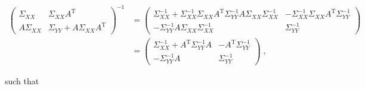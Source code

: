 \documentclass[a4paper,12pt]{article}
\begin{document}
\begin{equation} \label{eq:Sigma-yy-inv}
\begin{split}
\begin{pmatrix}
\Sigma_{XX}   & \Sigma_{XX} A^\mathrm{T} \\
A \Sigma_{XX} & \Sigma_{YY} + A \Sigma_{XX} A^\mathrm{T}
\end{pmatrix}^{-1}
&=\begin{pmatrix}
  \Sigma_{XX}^{-1} + \Sigma_{XX}^{-1} \Sigma_{XX} A^\mathrm{T} \Sigma_{YY}^{-1} A \Sigma_{XX} \Sigma_{XX}^{-1}
& -\Sigma_{XX}^{-1} \Sigma_{XX} A^\mathrm{T} \Sigma_{YY}^{-1} \\
  -\Sigma_{YY}^{-1} A \Sigma_{XX} \Sigma_{XX}^{-1}
& \Sigma_{YY}^{-1}
  \end{pmatrix} \\
&=\begin{pmatrix}
  \Sigma_{XX}^{-1} + A^\mathrm{T} \Sigma_{YY}^{-1} A
& -A^\mathrm{T} \Sigma_{YY}^{-1} \\
  -\Sigma_{YY}^{-1} A
& \Sigma_{YY}^{-1}
  \end{pmatrix} \; ,
\end{split}
\end{equation}

such that
\end{document}
